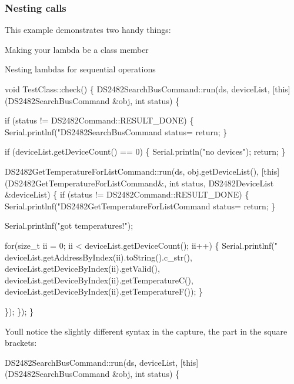 \subsubsection*{Nesting calls}

This example demonstrates two handy things\+:


\begin{DoxyItemize}
\item Making your lambda be a class member
\item Nesting lambdas for sequential operations
\end{DoxyItemize}


\begin{DoxyCode}
void TestClass::check() \{
    DS2482SearchBusCommand::run(ds, deviceList, [this](DS2482SearchBusCommand &obj, int status) \{

        if (status != DS2482Command::RESULT\_DONE) \{
            Serial.printlnf("DS2482SearchBusCommand status=%
            return;
        \}

        if (deviceList.getDeviceCount() == 0) \{
            Serial.println("no devices");
            return;
        \}

        DS2482GetTemperatureForListCommand::run(ds, obj.getDeviceList(),
       [this](DS2482GetTemperatureForListCommand&, int status, DS2482DeviceList &deviceList) \{
            if (status != DS2482Command::RESULT\_DONE) \{
                Serial.printlnf("DS2482GetTemperatureForListCommand status=%
                return;
            \}

            Serial.printlnf("got temperatures!");

            for(size\_t ii = 0; ii < deviceList.getDeviceCount(); ii++) \{
                Serial.printlnf("%
                        deviceList.getAddressByIndex(ii).toString().c\_str(),
                        deviceList.getDeviceByIndex(ii).getValid(),
                        deviceList.getDeviceByIndex(ii).getTemperatureC(),
                        deviceList.getDeviceByIndex(ii).getTemperatureF());
            \}

        \});
    \});
\}
\end{DoxyCode}


You\textquotesingle{}ll notice the slightly different syntax in the capture, the part in the square brackets\+:


\begin{DoxyCode}
DS2482SearchBusCommand::run(ds, deviceList, [this](DS2482SearchBusCommand &obj, int status) \{
\end{DoxyCode}


